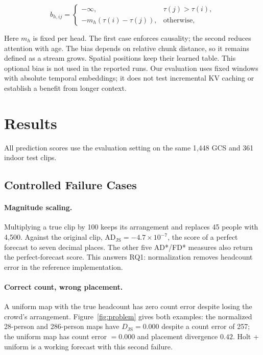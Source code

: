\documentclass{article}
\begin{document}
\begin{equation}
\label{eq:alibi}
b_{h,ij} =
\begin{cases}
-\infty, & \tau(j) > \tau(i), \\
-m_h \left( \tau(i) - \tau(j) \right), & \text{otherwise,}
\end{cases}
\end{equation}

Here $m_h$ is fixed per head. The first case enforces causality; the second reduces attention with age. The bias depends on relative chunk distance, so it remains defined as a stream grows. Spatial positions keep their learned table. This optional bias is not used in the reported runs. Our evaluation uses fixed windows with absolute temporal embeddings; it does not test incremental KV caching or establish a benefit from longer context.

\section{Results}
\label{sec:results}

All prediction scores use the evaluation setting on the same 1{,}448 GCS and 361 indoor test clips.

\subsection{Controlled Failure Cases}
\label{sec:results-controlled}

\paragraph{Magnitude scaling.} Multiplying a true clip by 100 keeps its arrangement and replaces 45 people with 4{,}500. Against the original clip, $\mathrm{AD_{JS}} = -4.7 \times 10^{-7}$, the score of a perfect forecast to seven decimal places. The other five AD*/FD* measures also return the perfect-forecast score. This answers RQ1: normalization removes headcount error in the reference implementation.

\paragraph{Correct count, wrong placement.} A uniform map with the true headcount has zero count error despite losing the crowd's arrangement. Figure~\ref{fig:problem} gives both examples: the normalized 28-person and 286-person maps have $D_{\mathrm{JS}} = 0.000$ despite a count error of 257; the uniform map has count error $= 0.000$ and placement divergence $0.42$. Holt + uniform is a working forecast with this second failure.
\end{document}
